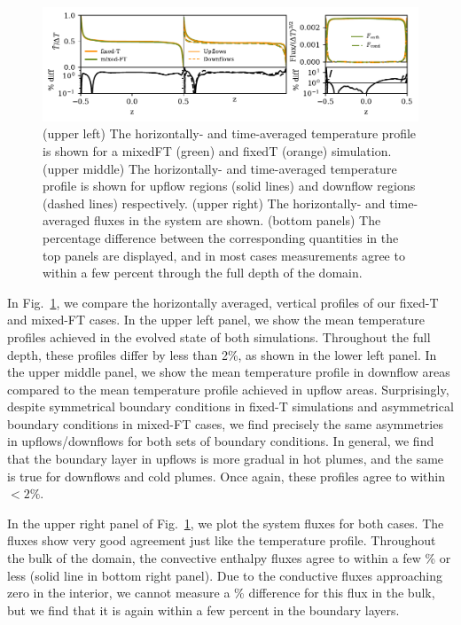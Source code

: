 \documentclass[aps, pre, onecolumn, nofootinbib, notitlepage, groupedaddress, amsfonts, amssymb, amsmath, longbibliography]{revtex4-1}
\begin{document}
\begin{figure}
\includegraphics[width=\textwidth]{./figs/rbc_1D_profiles.pdf}
\caption{ 
	(upper left) The horizontally- and time-averaged temperature profile is shown for a mixedFT (green) and fixedT (orange) simulation.
	(upper middle) The horizontally- and time-averaged temperature profile is shown for upflow regions (solid lines) and downflow regions (dashed lines) respectively.
	(upper right) The horizontally- and time-averaged fluxes in the system are shown.
	(bottom panels) The percentage difference between the corresponding quantities in the top panels are displayed, and in most cases measurements agree to within a few percent through the full depth of the domain.
\label{fig:rbc_1D_profiles} }
\end{figure}

In Fig.~\ref{fig:rbc_1D_profiles}, we compare the horizontally averaged, vertical profiles of our fixed-T and mixed-FT cases.
In the upper left panel, we show the mean temperature profiles achieved in the evolved state of both simulations.
Throughout the full depth, these profiles differ by less than 2\%, as shown in the lower left panel.
In the upper middle panel, we show the mean temperature profile in downflow areas compared to the mean temperature profile achieved in upflow areas.
Surprisingly, despite symmetrical boundary conditions in fixed-T simulations and asymmetrical boundary conditions in mixed-FT cases, we find precisely the same asymmetries in upflows/downflows for both sets of boundary conditions.
In general, we find that the boundary layer in upflows is more gradual in hot plumes, and the same is true for downflows and cold plumes.
Once again, these profiles agree to within $< 2\%$.

In the upper right panel of Fig.~\ref{fig:rbc_1D_profiles}, we plot the system fluxes for both cases.
The fluxes show very good agreement just like the temperature profile.
Throughout the bulk of the domain, the convective enthalpy fluxes agree to within a few \% or less (solid line in bottom right panel).
Due to the conductive fluxes approaching zero in the interior, we cannot measure a \% difference for this flux in the bulk, but we find that it is again within a few percent in the boundary layers.
\end{document}
